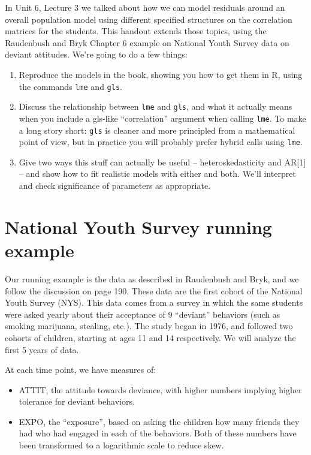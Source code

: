 \documentclass[
  letterpaper,
  DIV=11,
  numbers=noendperiod]{scrreprt}
\providecommand{\tightlist}{%
  \setlength{\itemsep}{0pt}\setlength{\parskip}{0pt}}\usepackage{longtable,booktabs,array}
\begin{document}
In Unit 6, Lecture 3 we talked about how we can model residuals around
an overall population model using different specified structures on the
correlation matrices for the students. This handout extends those
topics, using the Raudenbush and Bryk Chapter 6 example on National
Youth Survey data on deviant attitudes. We're going to do a few things:

\begin{enumerate}
\def\labelenumi{\arabic{enumi}.}
\item
  Reproduce the models in the book, showing you how to get them in R,
  using the commands \texttt{lme} and \texttt{gls}.
\item
  Discuss the relationship between \texttt{lme} and \texttt{gls}, and
  what it actually means when you include a gls-like ``correlation''
  argument when calling \texttt{lme}. To make a long story short:
  \texttt{gls} is cleaner and more principled from a mathematical point
  of view, but in practice you will probably prefer hybrid calls using
  \texttt{lme}.
\item
  Give two ways this stuff can actually be useful -- heteroskedasticity
  and AR{[}1{]} -- and show how to fit realistic models with either and
  both. We'll interpret and check significance of parameters as
  appropriate.
\end{enumerate}

\hypertarget{national-youth-survey-running-example}{%
\section{National Youth Survey running
example}\label{national-youth-survey-running-example}}

Our running example is the data as described in Raudenbush and Bryk, and
we follow the discussion on page 190. These data are the first cohort of
the National Youth Survey (NYS). This data comes from a survey in which
the same students were asked yearly about their acceptance of 9
``deviant'' behaviors (such as smoking marijuana, stealing, etc.). The
study began in 1976, and followed two cohorts of children, starting at
ages 11 and 14 respectively. We will analyze the first 5 years of data.

At each time point, we have measures of:

\begin{itemize}
\tightlist
\item
  ATTIT, the attitude towards deviance, with higher numbers implying
  higher tolerance for deviant behaviors.
\item
  EXPO, the ``exposure'', based on asking the children how many friends
  they had who had engaged in each of the behaviors. Both of these
  numbers have been transformed to a logarithmic scale to reduce skew.
\end{itemize}
\end{document}
